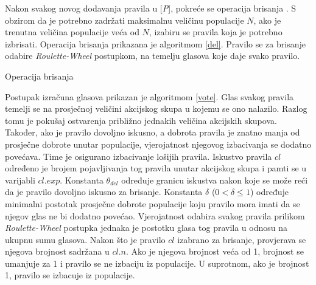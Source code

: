 \documentclass[times, utf8, zavrsni]{fer}
\begin{document}
Nakon svakog novog dodavanja pravila u [\emph{P}], pokreće se operacija brisanja \citep{1}.
S obzirom da je potrebno zadržati maksimalnu veličinu populacije $N$, ako je trenutna veličina populacije veća od $N$, izabiru se pravila koja je potrebno izbrisati.
Operacija brisanja prikazana je algoritmom \ref{del}.
Pravilo se za brisanje odabire \emph{Roulette-Wheel} postupkom, na temelju glasova koje daje svako pravilo.
\begin{algorithm}
    \caption{Operacija brisanja}
    \label{del}
    \begin{algorithmic}
        \RETURN
        \ENDIF
        \ENDFOR
        \STATE{$r$ := proizvoljan decimalni broj iz intervala [0, 1)}
        \ELSE
        \ENDIF
        \RETURN
        \ENDIF
        \ENDFOR
    \end{algorithmic}
\end{algorithm}
Postupak izračuna glasova prikazan je algoritmom \ref{vote}.
Glas svakog pravila temelji se na prosječnoj veličini akcijskog skupa u kojemu se ono nalazilo.
Razlog tomu je pokušaj ostvarenja približno jednakih veličina akcijskih skupova.
Također, ako je pravilo dovoljno iskusno, a dobrota pravila je znatno manja od prosječne dobrote unutar populacije, vjerojatnost njegovog izbacivanja se dodatno povećava.
Time je osigurano izbacivanje lošijih pravila.
Iskustvo pravila $cl$ određeno je brojem pojavljivanja tog pravila unutar akcijskog skupa i pamti se u varijabli $cl.exp$.
Konstanta $\theta_{del}$ određuje granicu iskustva nakon koje se može reći da je pravilo dovoljno iskusno za brisanje.
Konstanta $\delta$ ($0 < \delta \leq 1$) određuje minimalni postotak prosječne dobrote populacije koju pravilo mora imati da se njegov glas ne bi dodatno povećao.
Vjerojatnost odabira svakog pravila prilikom \emph{Roulette-Wheel} postupka jednaka je postotku glasa tog pravila u odnosu na ukupnu sumu glasova.
Nakon što je pravilo $cl$ izabrano za brisanje, provjerava se njegova brojnost sadržana u $cl.n$.
Ako je njegova brojnost veća od 1, brojnost se umanjuje za 1 i pravilo se ne izbaciju iz populacije.
U suprotnom, ako je brojnost 1, pravilo se izbacuje iz populacije.
\end{document}
